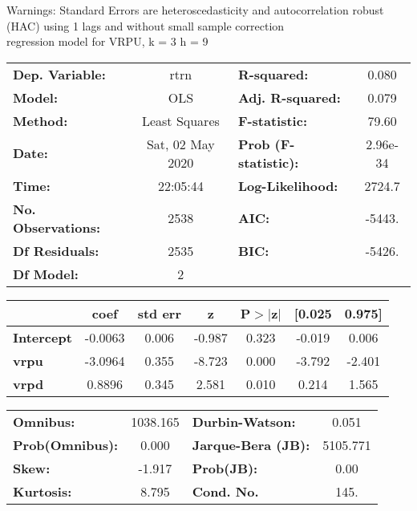 Warnings: \newline
 [1] Standard Errors are heteroscedasticity and autocorrelation robust (HAC) using 1 lags and without small sample correction\\ 

regression model for VRPU, k = 3 h = 9\begin{center}
\begin{tabular}{lclc}
\toprule
\textbf{Dep. Variable:}    &       rtrn       & \textbf{  R-squared:         } &     0.080   \\
\textbf{Model:}            &       OLS        & \textbf{  Adj. R-squared:    } &     0.079   \\
\textbf{Method:}           &  Least Squares   & \textbf{  F-statistic:       } &     79.60   \\
\textbf{Date:}             & Sat, 02 May 2020 & \textbf{  Prob (F-statistic):} &  2.96e-34   \\
\textbf{Time:}             &     22:05:44     & \textbf{  Log-Likelihood:    } &    2724.7   \\
\textbf{No. Observations:} &        2538      & \textbf{  AIC:               } &    -5443.   \\
\textbf{Df Residuals:}     &        2535      & \textbf{  BIC:               } &    -5426.   \\
\textbf{Df Model:}         &           2      & \textbf{                     } &             \\
\bottomrule
\end{tabular}
\begin{tabular}{lcccccc}
                   & \textbf{coef} & \textbf{std err} & \textbf{z} & \textbf{P$> |$z$|$} & \textbf{[0.025} & \textbf{0.975]}  \\
\midrule
\textbf{Intercept} &      -0.0063  &        0.006     &    -0.987  &         0.323        &       -0.019    &        0.006     \\
\textbf{vrpu}      &      -3.0964  &        0.355     &    -8.723  &         0.000        &       -3.792    &       -2.401     \\
\textbf{vrpd}      &       0.8896  &        0.345     &     2.581  &         0.010        &        0.214    &        1.565     \\
\bottomrule
\end{tabular}
\begin{tabular}{lclc}
\textbf{Omnibus:}       & 1038.165 & \textbf{  Durbin-Watson:     } &    0.051  \\
\textbf{Prob(Omnibus):} &   0.000  & \textbf{  Jarque-Bera (JB):  } & 5105.771  \\
\textbf{Skew:}          &  -1.917  & \textbf{  Prob(JB):          } &     0.00  \\
\textbf{Kurtosis:}      &   8.795  & \textbf{  Cond. No.          } &     145.  \\
\bottomrule
\end{tabular}
\end{center}

